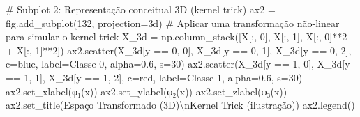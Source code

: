 \documentclass[
  brazilian,
]{report}
\newenvironment{Shaded}{\begin{snugshade}}{\end{snugshade}}
\newcommand{\CharTok}[1]{\textcolor[rgb]{0.13,0.47,0.30}{#1}}
\newcommand{\CommentTok}[1]{\textcolor[rgb]{0.37,0.37,0.37}{#1}}
\newcommand{\DecValTok}[1]{\textcolor[rgb]{0.68,0.00,0.00}{#1}}
\newcommand{\FloatTok}[1]{\textcolor[rgb]{0.68,0.00,0.00}{#1}}
\newcommand{\NormalTok}[1]{\textcolor[rgb]{0.00,0.23,0.31}{#1}}
\newcommand{\OperatorTok}[1]{\textcolor[rgb]{0.37,0.37,0.37}{#1}}
\newcommand{\StringTok}[1]{\textcolor[rgb]{0.13,0.47,0.30}{#1}}
\begin{document}
\begin{tcolorbox}
\begin{Shaded}
\begin{Highlighting}[]
\CommentTok{\# Subplot 2: Representação conceitual 3D (kernel trick)}
\NormalTok{ax2 }\OperatorTok{=}\NormalTok{ fig.add\_subplot(}\DecValTok{132}\NormalTok{, projection}\OperatorTok{=}\StringTok{\textquotesingle{}3d\textquotesingle{}}\NormalTok{)}
\CommentTok{\# Aplicar uma transformação não{-}linear para simular o kernel trick}
\NormalTok{X\_3d }\OperatorTok{=}\NormalTok{ np.column\_stack([X[:, }\DecValTok{0}\NormalTok{], X[:, }\DecValTok{1}\NormalTok{], X[:, }\DecValTok{0}\NormalTok{]}\OperatorTok{**}\DecValTok{2} \OperatorTok{+}\NormalTok{ X[:, }\DecValTok{1}\NormalTok{]}\OperatorTok{**}\DecValTok{2}\NormalTok{])}
\NormalTok{ax2.scatter(X\_3d[y }\OperatorTok{==} \DecValTok{0}\NormalTok{, }\DecValTok{0}\NormalTok{], X\_3d[y }\OperatorTok{==} \DecValTok{0}\NormalTok{, }\DecValTok{1}\NormalTok{], X\_3d[y }\OperatorTok{==} \DecValTok{0}\NormalTok{, }\DecValTok{2}\NormalTok{], }
\NormalTok{           c}\OperatorTok{=}\StringTok{\textquotesingle{}blue\textquotesingle{}}\NormalTok{, label}\OperatorTok{=}\StringTok{\textquotesingle{}Classe 0\textquotesingle{}}\NormalTok{, alpha}\OperatorTok{=}\FloatTok{0.6}\NormalTok{, s}\OperatorTok{=}\DecValTok{30}\NormalTok{)}
\NormalTok{ax2.scatter(X\_3d[y }\OperatorTok{==} \DecValTok{1}\NormalTok{, }\DecValTok{0}\NormalTok{], X\_3d[y }\OperatorTok{==} \DecValTok{1}\NormalTok{, }\DecValTok{1}\NormalTok{], X\_3d[y }\OperatorTok{==} \DecValTok{1}\NormalTok{, }\DecValTok{2}\NormalTok{], }
\NormalTok{           c}\OperatorTok{=}\StringTok{\textquotesingle{}red\textquotesingle{}}\NormalTok{, label}\OperatorTok{=}\StringTok{\textquotesingle{}Classe 1\textquotesingle{}}\NormalTok{, alpha}\OperatorTok{=}\FloatTok{0.6}\NormalTok{, s}\OperatorTok{=}\DecValTok{30}\NormalTok{)}
\NormalTok{ax2.set\_xlabel(}\StringTok{\textquotesingle{}φ₁(x)\textquotesingle{}}\NormalTok{)}
\NormalTok{ax2.set\_ylabel(}\StringTok{\textquotesingle{}φ₂(x)\textquotesingle{}}\NormalTok{)}
\NormalTok{ax2.set\_zlabel(}\StringTok{\textquotesingle{}φ₃(x)\textquotesingle{}}\NormalTok{)}
\NormalTok{ax2.set\_title(}\StringTok{\textquotesingle{}Espaço Transformado (3D)}\CharTok{\textbackslash{}n}\StringTok{Kernel Trick (ilustração)\textquotesingle{}}\NormalTok{)}
\NormalTok{ax2.legend()}


\end{Highlighting}
\end{Shaded}
\end{tcolorbox}
\end{document}
